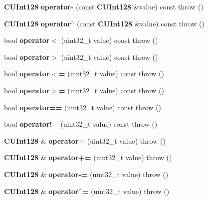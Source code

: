 \begin{DoxyCompactItemize}
\item 
{\bf CUInt128} {\bfseries operator-\/} (const {\bf CUInt128} \&value) const   throw ()\label{classKademlia_1_1CUInt128_ac8ee014fab2ebc5e67c9b0b9ed5d85a4}

\item 
{\bf CUInt128} {\bfseries operator$^\wedge$} (const {\bf CUInt128} \&value) const   throw ()\label{classKademlia_1_1CUInt128_ae8e1eefab9039f0614a889d5c3e497d9}

\item 
bool {\bfseries operator$<$} (uint32\_\-t value) const   throw ()\label{classKademlia_1_1CUInt128_a85ede02ff8947ea7df56cd204ed1945b}

\item 
bool {\bfseries operator$>$} (uint32\_\-t value) const   throw ()\label{classKademlia_1_1CUInt128_a61a6b34c2e9a8f2de2e882077fec3eb8}

\item 
bool {\bfseries operator$<$=} (uint32\_\-t value) const   throw ()\label{classKademlia_1_1CUInt128_aae0c1bc768df492efa54e4645161aae4}

\item 
bool {\bfseries operator$>$=} (uint32\_\-t value) const   throw ()\label{classKademlia_1_1CUInt128_a71aead1e1550b6ce09d0600cc8a26122}

\item 
bool {\bfseries operator==} (uint32\_\-t value) const   throw ()\label{classKademlia_1_1CUInt128_a96ba12123aaaac9ad6d8ba8c02f4928b}

\item 
bool {\bfseries operator!=} (uint32\_\-t value) const   throw ()\label{classKademlia_1_1CUInt128_a5052f5d0d24b3c1c65243153c4a8fce4}

\item 
{\bf CUInt128} \& {\bfseries operator=} (uint32\_\-t value)  throw ()\label{classKademlia_1_1CUInt128_a76de7cebc6ebd5b9f5046850d4a4476c}

\item 
{\bf CUInt128} \& {\bfseries operator+=} (uint32\_\-t value)  throw ()\label{classKademlia_1_1CUInt128_a3c4bae283efa36c41590989257dadda2}

\item 
{\bf CUInt128} \& {\bfseries operator-\/=} (uint32\_\-t value)  throw ()\label{classKademlia_1_1CUInt128_ad48700aac8c628c925e34398702f2418}

\item 
{\bf CUInt128} \& {\bfseries operator$^\wedge$=} (uint32\_\-t value)  throw ()\label{classKademlia_1_1CUInt128_a25437b5c7d3503f6a1c1408923efaf53}


\end{DoxyCompactItemize}
